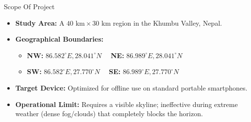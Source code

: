 
\begin{frame}{Scope Of Project}
    \begin{itemize}
        \item \textbf{Study Area:} A $40 \text{ km} \times 30 \text{ km}$ region in the Khumbu Valley, Nepal.
        
        \item \textbf{Geographical Boundaries:}
            \begin{itemize}
                \item \small \textbf{NW:} $86.582^\circ E, 28.041^\circ N \quad$ \textbf{NE:} $86.989^\circ E, 28.041^\circ N$
                \item \small \textbf{SW:} $86.582^\circ E, 27.770^\circ N \quad$ \textbf{SE:} $86.989^\circ E, 27.770^\circ N$
            \end{itemize}
            
        \item \textbf{Target Device:} Optimized for offline use on standard portable smartphones.
        
        \item \textbf{Operational Limit:} Requires a visible skyline; ineffective during extreme weather (dense fog/clouds) that completely blocks the horizon.
    \end{itemize}
\end{frame}